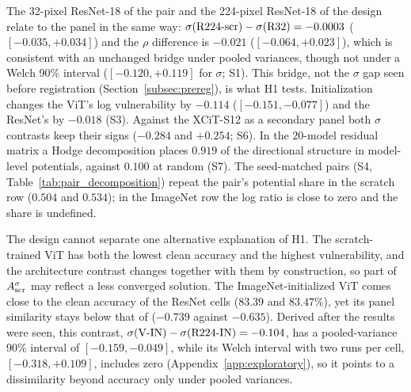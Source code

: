 The 32-pixel ResNet-18 of the pair and the 224-pixel ResNet-18 of the design relate to the panel in the same way: $\sigma(\mbox{R224-scr}) - \sigma(\mbox{R32}) = -0.0003$ ($[-0.035, +0.034]$) and the $\rho$ difference is $-0.021$ ($[-0.064, +0.023]$), which is consistent with an unchanged bridge under pooled variances, though not under a Welch 90\% interval ($[-0.120, +0.119]$ for $\sigma$; S1). This bridge, not the $\sigma$ gap seen before registration (Section~\ref{subsec:prereg}), is what H1 tests. Initialization changes the ViT's log vulnerability by $-0.114$ ($[-0.151, -0.077]$) and the ResNet's by $-0.018$ (S3). Against the XCiT-S12 as a secondary panel both $\sigma$ contrasts keep their signs ($-0.284$ and $+0.254$; S6). In the $20$-model residual matrix a Hodge decomposition places $0.919$ of the directional structure in model-level potentials, against $0.100$ at random (S7). The seed-matched pairs (S4, Table~\ref{tab:pair_decomposition}) repeat the pair's potential share in the scratch row ($0.504$ and $0.534$); in the ImageNet row the log ratio is close to zero and the share is undefined.

The design cannot separate one alternative explanation of H1. The scratch-trained ViT has both the lowest clean accuracy and the highest vulnerability, and the architecture contrast changes together with them by construction, so part of $A^{\sigma}_{\mathrm{scr}}$ may reflect a less converged solution. The ImageNet-initialized ViT comes close to the clean accuracy of the ResNet cells ($83.39$ and $83.47\%$), yet its panel similarity stays below that of  ($-0.739$ against $-0.635$). Derived after the results were seen, this contrast, $\sigma(\mbox{V-IN}) - \sigma(\mbox{R224-IN}) = -0.104$, has a pooled-variance 90\% interval of $[-0.159, -0.049]$, while its Welch interval with two runs per cell, $[-0.318, +0.109]$, includes zero (Appendix~\ref{app:exploratory}), so it points to a dissimilarity beyond accuracy only under pooled variances.

